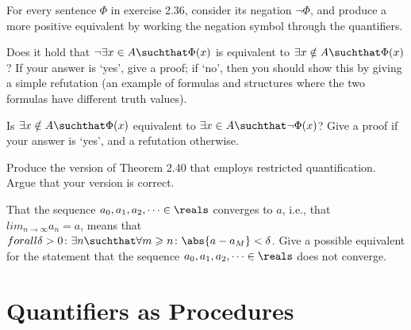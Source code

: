 \documentclass{report}
\newcommand{\Conid}[1]{\mathit{#1}}
\newcommand{\Varid}[1]{\mathit{#1}}
\renewcommand{\geq}{\geqslant}
\def\resethooks{%
  \global\let\SaveRestoreHook\empty
  \global\let\ColumnHook\empty}
\let\hspre\empty
\let\hspost\empty
\begin{document}
\begin{Exercise} [number=39]
    For every sentence $\Phi$ in exercise 2.36, consider its negation $\neg\Phi$, and produce a more positive equivalent by working the negation symbol through the quantifiers.
\end{Exercise}

\begin{Exercise} [number=46]
    Does it hold that $\neg\exists{x} \in A \suchthat \Phi(x)$ is equivalent to $\exists{x} \notin A \suchthat \Phi(x)$? If your answer is `yes', give a proof; if `no', then you should show this by giving a simple refutation (an example of formulas and structures where the two formulas have different truth values).
\end{Exercise}

\begin{Exercise} [number=47]
    Is $\exists{x} \notin A \suchthat \Phi(x)$ equivalent to $\exists{x} \in A \suchthat \neg\Phi(x)$? Give a proof if your answer is `yes', and a refutation otherwise.
\end{Exercise}

\begin{Exercise} [number=48]
    Produce the version of Theorem 2.40 that employs restricted quantification. Argue that your version is correct.
\end{Exercise}

\begin{Exercise} [number=50]
    That the sequence $a_0, a_1, a_2, \dots \in \reals$ converges to $a$, i.e., that $lim_{n \to \infty} a_n = a$, means that $forall{\delta} > 0 \colon \exists{n} \suchthat \forall{m \geq n} \colon \abs{a - a_M} < \delta$. Give a possible equivalent for the statement that the sequence $a_0, a_1, a_2, \dots \in \reals$ does not converge.
\end{Exercise}
\section{Quantifiers as Procedures}
\label{sec:Quantifiers_as_procedures}

\resethooks
\end{document}
